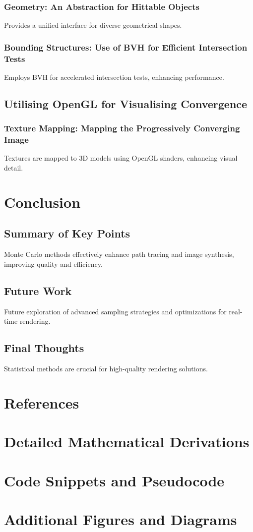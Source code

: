\documentclass[12pt]{article}
\begin{document}
\subsubsection{Geometry: An Abstraction for Hittable Objects}
Provides a unified interface for diverse geometrical shapes.

\subsubsection{Bounding Structures: Use of BVH for Efficient Intersection Tests}
Employs BVH for accelerated intersection tests, enhancing performance.

\subsection{Utilising OpenGL for Visualising Convergence}
\subsubsection{Texture Mapping: Mapping the Progressively Converging Image}
Textures are mapped to 3D models using OpenGL shaders, enhancing visual detail.

\section{Conclusion}
\label{sec:conclusion}
\subsection{Summary of Key Points}
Monte Carlo methods effectively enhance path tracing and image synthesis, improving quality and efficiency.

\subsection{Future Work}
Future exploration of advanced sampling strategies and optimizations for real-time rendering.

\subsection{Final Thoughts}
Statistical methods are crucial for high-quality rendering solutions.

\section{References}
\label{sec:references}




\appendix
\section{Detailed Mathematical Derivations}
\label{sec:appendix-derivations}

\section{Code Snippets and Pseudocode}
\label{sec:appendix-code}

\section{Additional Figures and Diagrams}
\label{sec:appendix-figures}
\end{document}
